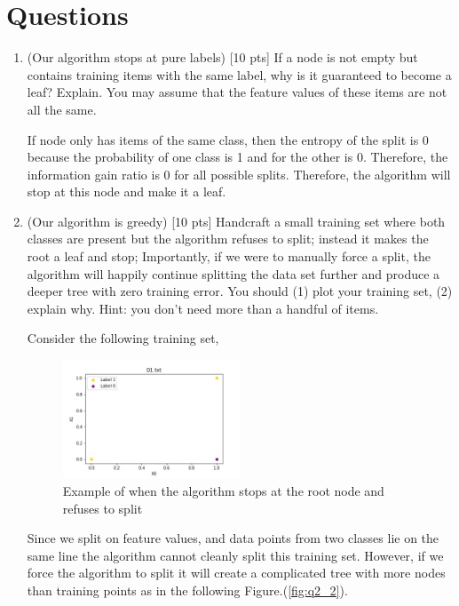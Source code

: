 \documentclass[a4paper]{article}
\theoremstyle{definition}
\newenvironment{soln}{
    \leavevmode\color{blue}\ignorespaces
}{}
\begin{document}
\section{Questions}
\begin{enumerate}
\item (Our algorithm stops at pure labels) [10 pts] If a node is not empty but contains training items with the same label, why is it guaranteed to become a leaf?  Explain. You may assume that the feature values of these items are not all the same. \\

  \begin{soln}
    If node only has items of the same class, then the entropy of the split is 0 because the probability of one class is 1 and for the other is 0. Therefore, the information gain ratio is 0 for all possible splits. Therefore, the algorithm will stop at this node and make it a leaf.
  \end{soln}

\item (Our algorithm is greedy)  [10 pts] Handcraft a small training set where both classes are present but the algorithm refuses to split; instead it makes the root a leaf and stop;
Importantly, if we were to manually force a split, the algorithm will happily continue splitting the data set further and produce a deeper tree with zero training error.
You should (1) plot your training set, (2) explain why.  Hint: you don't need more than a handful of items. \\

\begin{soln}
  Consider the following training set,
  \begin{figure}[H]
    \centering
    \includegraphics[width=0.5\textwidth]{hand_scatter.jpg}
    \caption{Example of when the algorithm stops at the root node and refuses to split}
    \label{fig:q2_1}
  \end{figure}

  Since we split on feature values, and data points from two classes lie on the same line the algorithm cannot cleanly split this training set. However, if we force the algorithm to split it will create a complicated tree with more nodes than training points as in the following Figure.(\ref{fig:q2_2}).


\end{soln}
\end{enumerate}
\end{document}
